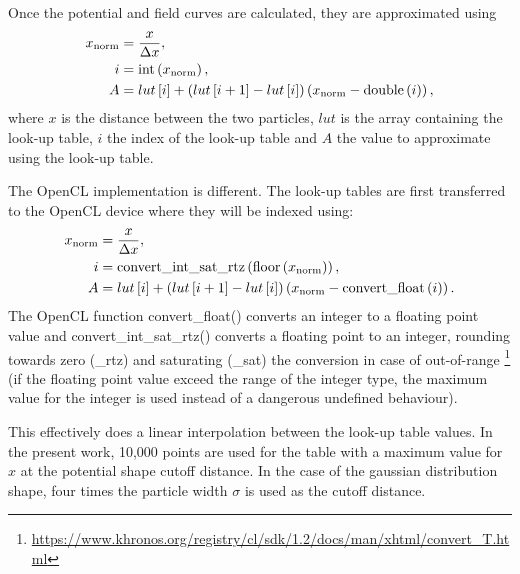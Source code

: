 Once the potential and field curves are calculated, they are approximated using
\begin{align}
x_{\textrm{norm}} & = \frac{x}{\Delta x}, \\
i   & = \textrm{int}\left( x_{\textrm{norm}} \right), \\
A   &= lut\left[ i \right] + \left( lut\left[ i+1 \right]-lut\left[ i \right] \right) \left( x_{\textrm{norm}}-\textrm{double}\left( i \right) \right),
\end{align}
where $x$ is the distance between the two particles, $lut$ is the array
containing the look-up table, $i$ the index of the look-up table and $A$ the
value to approximate using the look-up table.

The OpenCL implementation is different. The look-up tables are first transferred
to the OpenCL device where they will be indexed using:
\begin{align}
x_{\textrm{norm}} & = \frac{x}{\Delta x}, \\
i   & = \textrm{convert\_int\_sat\_rtz}\left( \textrm{floor}\left( x_{\textrm{norm}} \right) \right), \\
A   &= lut\left[ i \right] + \left( lut\left[ i+1 \right]-lut\left[ i \right] \right) \left( x_{\textrm{norm}}-\textrm{convert\_float}\left( i \right) \right).
\end{align}
The OpenCL function
convert\_float() converts an integer to a floating point value
and convert\_int\_sat\_rtz() converts a floating point to an integer,
rounding towards zero (\_rtz) and saturating (\_sat) the conversion in case of
out-of-range
\footnote{\url{https://www.khronos.org/registry/cl/sdk/1.2/docs/man/xhtml/convert_T.html}}
(if the floating point value exceed the range of the integer type,
the maximum value for the integer is used instead of a dangerous undefined
behaviour).

This effectively does a linear interpolation between the look-up table values.
In the present work, 10,000 points are used for the table with a maximum value
for $x$ at the potential shape cutoff distance. In the case of the gaussian
distribution shape, four times the particle width $\sigma$ is used as the cutoff
distance.

